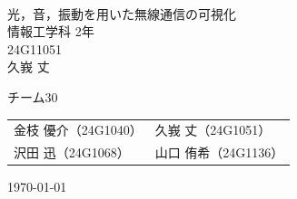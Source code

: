 \documentclass[uplatex,dvipdfmx]{jlreq}
\begin{document}
\begin{titlepage}
\vspace*{2cm}
\centering
\Huge\textsf{}\\[2cm]
\centering
\Huge\textsf{光，音，振動を用いた無線通信の可視化}\\[2cm]
\Large\textsf{情報工学科 2年}\\
\Large\textsf{24G11051}\\[5pt]
\huge\textsf{久峩 丈}

\vspace*{1cm}
\Large\sffamily
\begin{itembox}[c]{チーム30}
\centering
\begin{tabular}{ll}
金枝 優介（24G1040）&
久峩 丈（24G1051）\\
沢田 迅（24G1068）&
山口 侑希（24G1136）\\

\end{tabular}
\end{itembox}

\vspace*{2cm}
\Large\textsf{\today}
\end{titlepage}
\clearpage
% 







\appendix

\end{document}
